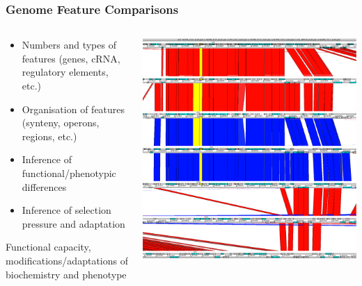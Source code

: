 \begin{frame}
  \frametitle{Genome Feature Comparisons}
  \begin{columns}
    \begin{column}{5cm}
      \begin{itemize}
        \item Numbers and types of features (genes, cRNA, regulatory elements, etc.)
        \item Organisation of features (synteny, operons, regions, etc.)
        \item Inference of functional/phenotypic differences
        \item Inference of selection pressure and adaptation
      \end{itemize}  
      Functional capacity, modifications/adaptations of biochemistry and phenotype  
    \end{column}
    \begin{column}{5cm}
      \includegraphics[width=1\textwidth]{images/t6ss}    
    \end{column}
  \end{columns}
\end{frame}